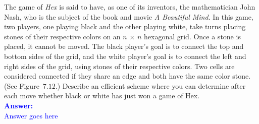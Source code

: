 \item{}
The game of \emph{Hex} is said to have, as one of its inventors, the
mathematician John Nash, who is the subject of the book and movie \emph{A
Beautiful Mind}. In this game, two players, one playing black and the other
playing white, take turns placing stones of their respective colors on an
$n\,\times\,n$ hexagonal grid. Once a stone is placed, it cannot be moved. The
black player's goal is to connect the top and bottom sides of the grid, and the
white player's goal is to connect the left and right sides of the grid, using
stones of their respective colors. Two cells are considered connected if they
share an edge and both have the same color stone. (See Figure~$7.12$.) Describe
an efficient scheme where you can determine after each move whether black or
white has just won a game of Hex.\\[12pt]
\ifanswers
\textcolor{blue}{
\textbf{Answer:}\\[6pt]
Answer goes here
}
\newpage
\fi
